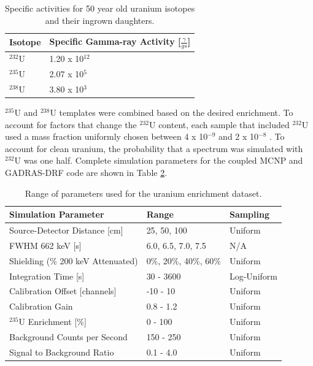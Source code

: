 \begin{table}[H]
\centering
\caption{Specific activities for 50 year old uranium isotopes and their ingrown daughters.}
\label{table:specific_activities_radsrc}
\begin{tabular}{ll}
\hline
\textbf{Isotope} & \textbf{Specific Gamma-ray Activity [$\frac{\gamma}{g s}$]} \\ \hline
$^{232}$U & 1.20 x 10$^{12}$ \\ 
$^{235}$U & 2.07 x 10$^{5}$ \\
$^{238}$U & 3.80 x 10$^{3}$ \\ \hline
\end{tabular}
\end{table}



$^{235}$U and $^{238}$U templates were combined based on the desired enrichment. To account for factors that change the $^{232}$U content, each sample that included $^{232}$U used a mass fraction uniformly chosen between 4 x 10$^{-9}$ and 2 x 10$^{-8}$ \cite{Peurrung2019}. To account for clean uranium, the probability that a spectrum was simulated with $^{232}$U was one half. Complete simulation parameters for the coupled MCNP and GADRAS-DRF code are shown in Table \ref{table:hyperparameter_dataset_full_parameters_enrichment}.

\begin{table}[H]
\centering
\caption{Range of parameters used for the uranium enrichment dataset.}
\label{table:hyperparameter_dataset_full_parameters_enrichment}
\begin{tabular}{lll}
\hline
\textbf{Simulation Parameter} & \textbf{Range} & \textbf{Sampling} \\ \hline
Source-Detector Distance [cm] & 25, 50, 100 & Uniform \\ %
FWHM 662 keV [s] & 6.0, 6.5, 7.0, 7.5 & N/A \\ %
Shielding (\% 200 keV Attenuated) & 0\%, 20\%, 40\%, 60\% & Uniform \\ %
Integration Time [s] & 30 - 3600 & Log-Uniform \\ %
Calibration Offset [channels] & -10 - 10 & Uniform \\ %
Calibration Gain & 0.8 - 1.2 & Uniform \\ %
$^{235}$U Enrichment [\%] & 0 - 100 & Uniform \\ %
Background Counts per Second & 150 - 250 & Uniform \\ %
Signal to Background Ratio & 0.1 - 4.0 & Uniform \\ \hline
\end{tabular}
\end{table}


